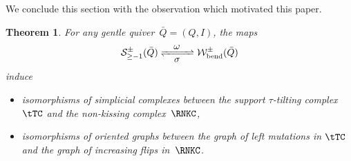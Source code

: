 \documentclass{memo-l}
\newtheorem{theorem}{Theorem}[part]
\theoremstyle{definition}
\newcommand{\strings}{\mathcal{S}} %
\newcommand{\bendingWalks}{\mathcal{W}_\mathrm{bend}} %
\begin{document}
\enlargethispage{.5cm}
We conclude this section with the observation which motivated this paper.

\begin{theorem}
\label{thm:nkc/sttiltc}
For any gentle quiver~$\bar Q = (Q,I)$, the maps
\[
\strings_{\ge-1}^\pm(\bar Q) \xrightleftharpoons[\quad\mbox{$\sigma$}\;\quad]{\mbox{$\omega$}} \bendingWalks^\pm(\bar Q)
\]
induce
\begin{itemize}
\item isomorphisms of simplicial complexes between the support $\tau$-tilting complex~$\tTC$ and the non-kissing complex~$\RNKC$,
\item isomorphisms of oriented graphs between the graph of left mutations in $\tTC$ and the graph of increasing flips in~$\RNKC$.
\end{itemize}
\end{theorem}
\end{document}
